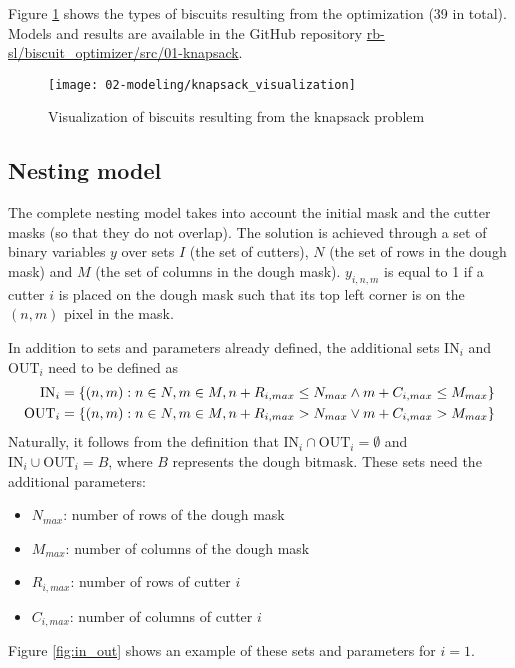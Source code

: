 Figure \ref{fig:knapsack} shows the types of biscuits resulting from the optimization (39 in total). Models and results are available in the GitHub repository \href{https://github.com/rb-sl/biscuit_optimizer/tree/main/src/01-knapsack}{rb-sl/biscuit\_optimizer/src/01-knapsack}.

\begin{figure}[H]
	\centering	
	\texttt{[image: 02-modeling/knapsack\_visualization]}
	\caption{Visualization of biscuits resulting from the knapsack problem}
	\label{fig:knapsack}
\end{figure}

\subsection{Nesting model}\label{sec:nesting}
The complete nesting model takes into account the initial mask and the cutter masks (so that they do not overlap). The solution is achieved through a set of binary variables $y$ over sets $I$ (the set of cutters), $N$ (the set of rows in the dough mask) and $M$ (the set of columns in the dough mask). $y_{i, n, m}$ is equal to 1 if a cutter $i$ is placed on the dough mask such that its top left corner is on the $(n, m)$ pixel in the mask.

In addition to sets and parameters already defined, the additional sets $\textrm{IN}_i$ and $\textrm{OUT}_i$ need to be defined as
\begin{alignat}{1}
	\textrm{IN}_i	& = \{(n, m): n \in N, m \in M, n + R_{i,max} \leq N_{max} \wedge m + C_{i,max} \leq M_{max} \} \notag \\
	\textrm{OUT}_i 	& = \{(n, m): n \in N, m \in M, n + R_{i,max} > N_{max} \vee m + C_{i,max} > M_{max} \} \notag
\end{alignat}
Naturally, it follows from the definition that $\textrm{IN}_i \cap \textrm{OUT}_i = \emptyset$ and $\textrm{IN}_i \cup \textrm{OUT}_i = B$, where $B$ represents the dough bitmask.
These sets need the additional parameters:
\begin{itemize}[itemsep=-1mm, topsep=0mm]
	\item $N_{max}$: number of rows of the dough mask
	\item $M_{max}$: number of columns of the dough mask
	\item $R_{i,max}$: number of rows of cutter $i$
	\item $C_{i,max}$: number of columns of cutter $i$
\end{itemize}
Figure \ref{fig:in_out} shows an example of these sets and parameters for $i=1$.

